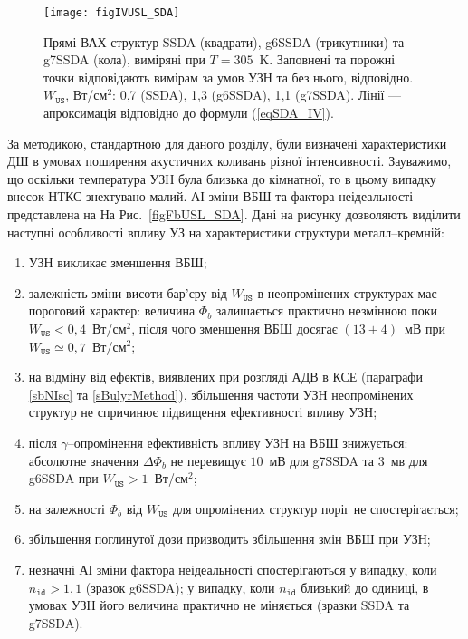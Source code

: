 \begin{figure}[b]
\center
\texttt{[image: figIVUSL\_SDA]}
\caption{\label{figIVUSL_SDA}
Прямі  ВАХ  структур SSDA (квадрати), g6SSDA (трикутники) та g7SSDA (кола), виміряні при $T=305$~K.
Заповнені та порожні точки відповідають вимірам за умов УЗН та без нього, відповідно.
$W_\mathtt{US}$, Вт/см$^2$: 0,7 (SSDA), 1,3 (g6SSDA), 1,1 (g7SSDA).
Лінії --- апроксимація відповідно до формули (\ref{eqSDA_IV}).
}%
\end{figure}

За методикою, стандартною для даного розділу, були визначені характеристики ДШ в умовах поширення акустичних коливань різної інтенсивності.
Зауважимо, що оскільки температура УЗН була близька до кімнатної, то в цьому випадку внесок НТКС знехтувано малий.
АІ зміни ВБШ та фактора неідеальності представлена на На Рис.~\ref{figFbUSL_SDA}.
Дані на рисунку дозволяють виділити наступні особливості  впливу УЗ на характеристики структури металл--кремній:
\begin{enumerate}[label=\asbuk*),leftmargin=0em,itemindent=1.5em]
\item УЗН викликає зменшення ВБШ;

\item залежність зміни висоти бар'єру від $W_\mathtt{US}$ в неопромінених структурах має пороговий характер:
     величина $\Phi_b$ залишається практично незмінною поки \mbox{$W_\mathtt{US}<0,4$~Вт/см$^2$}, після чого
    зменшення ВБШ досягає $(13\pm4)$~мВ при $W_\mathtt{US}\simeq0,7$~Вт/см$^2$;

\item на відміну від ефектів, виявлених при розгляді АДВ в КСЕ (параграфи \ref{sbNIsc} та \ref{sBulyrMethod}), збільшення частоти УЗН неопромінених структур не спричинює
підвищення ефективності впливу УЗН;

\item після $\gamma$--опромінення ефективність впливу УЗН на ВБШ знижується:
абсолютне значення $\Delta\Phi_b$ не перевищує $10$~мВ для g7SSDA та $3$~мв  для g6SSDA при $W_\mathtt{US}>1$~Вт/см$^2$;

\item на залежності $\Phi_b$ від $W_\mathtt{US}$ для опромінених структур поріг не спостерігається;

\item збільшення поглинутої дози призводить збільшення змін ВБШ при УЗН;

\item незначні АІ зміни фактора неідеальності спостерігаються у випадку, коли $n_\mathtt{id}>1,1$ (зразок g6SSDA);
    у випадку, коли $n_\mathtt{id}$ близький до одиниці, в умовах УЗН його величина практично не міняється (зразки SSDA та g7SSDA).
\end{enumerate}

